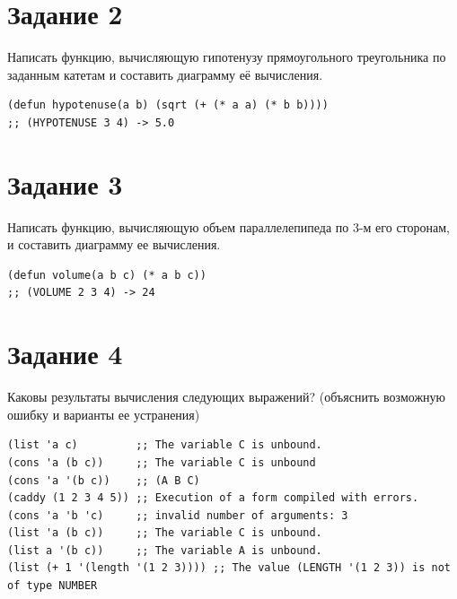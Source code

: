 \documentclass[a4paper,14pt, unknownkeysallowed]{extreport}
\begin{document}
\section{Задание 2}

Написать функцию, вычисляющую гипотенузу прямоугольного треугольника по заданным катетам и составить диаграмму её вычисления.

\begin{center}
\captionsetup{justification=raggedright,singlelinecheck=off}
\begin{lstlisting}[label=lst:parallel_processing,caption=Решение задания 2]
(defun hypotenuse(a b) (sqrt (+ (* a a) (* b b))))
;; (HYPOTENUSE 3 4) -> 5.0
\end{lstlisting}
\end{center}

\section{Задание 3}

Написать функцию, вычисляющую объем параллелепипеда по 3-м его сторонам, и составить диаграмму ее вычисления.

\begin{center}
\captionsetup{justification=raggedright,singlelinecheck=off}
\begin{lstlisting}[label=lst:parallel_processing,caption=Решение задания 3]
(defun volume(a b c) (* a b c))
;; (VOLUME 2 3 4) -> 24
\end{lstlisting}
\end{center}

\section{Задание 4}

Каковы результаты вычисления следующих выражений? (объяснить возможную ошибку и варианты ее устранения)

\begin{center}
\captionsetup{justification=raggedright,singlelinecheck=off}
\begin{lstlisting}[label=lst:parallel_processing,caption=Решение задания 4]
(list 'a c)         ;; The variable C is unbound.
(cons 'a (b c))     ;; The variable C is unbound
(cons 'a '(b c))    ;; (A B C)
(caddy (1 2 3 4 5)) ;; Execution of a form compiled with errors.
(cons 'a 'b 'c)     ;; invalid number of arguments: 3
(list 'a (b c))     ;; The variable C is unbound.
(list a '(b c))     ;; The variable A is unbound.
(list (+ 1 '(length '(1 2 3)))) ;; The value (LENGTH '(1 2 3)) is not of type NUMBER
\end{lstlisting}
\end{center}
\end{document}
